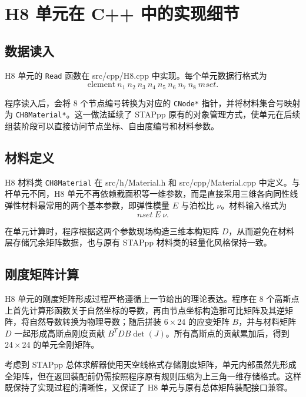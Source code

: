 \documentclass[12pt,a4paper]{article}
\begin{document}
\section{H8 单元在 C++ 中的实现细节}

\subsection{数据读入}

H8 单元的 \texttt{Read} 函数在 src/cpp/H8.cpp 中实现。每个单元数据行格式为
\begin{equation}
\text{element}\ n_1\ n_2\ n_3\ n_4\ n_5\ n_6\ n_7\ n_8\ mset.
\end{equation}

程序读入后，会将 8 个节点编号转换为对应的 \texttt{CNode*} 指针，并将材料集合号映射为 \texttt{CH8Material*}。这一做法延续了 STAPpp 原有的对象管理方式，使单元在后续组装阶段可以直接访问节点坐标、自由度编号和材料参数。

\subsection{材料定义}

H8 材料类 \texttt{CH8Material} 在 src/h/Material.h 和 src/cpp/Material.cpp 中定义。与杆单元不同，H8 单元不再依赖截面积等一维参数，而是直接采用三维各向同性线弹性材料最常用的两个基本参数，即弹性模量 $E$ 与泊松比 $\nu$。材料输入格式为
\begin{equation}
nset\ E\ \nu.
\end{equation}

在单元计算时，程序根据这两个参数现场构造三维本构矩阵 $D$，从而避免在材料层存储冗余矩阵数据，也与原有 STAPpp 材料类的轻量化风格保持一致。

\subsection{刚度矩阵计算}

H8 单元的刚度矩阵形成过程严格遵循上一节给出的理论表达。程序在 8 个高斯点上首先计算形函数关于自然坐标的导数，再由节点坐标构造雅可比矩阵及其逆矩阵，将自然导数转换为物理导数；随后拼装 6\,$\times$\,24 的应变矩阵 $B$，并与材料矩阵 $D$ 一起形成高斯点刚度贡献 $B^TDB\det(J)$。所有高斯点的贡献累加后，得到 24\,$\times$\,24 的单元全刚矩阵。

考虑到 STAPpp 总体求解器使用天空线格式存储刚度矩阵，单元内部虽然先形成全矩阵，但在返回装配前仍需按照程序原有规则压缩为上三角一维存储格式。这样既保持了实现过程的清晰性，又保证了 H8 单元与原有总体矩阵装配接口兼容。
\end{document}
